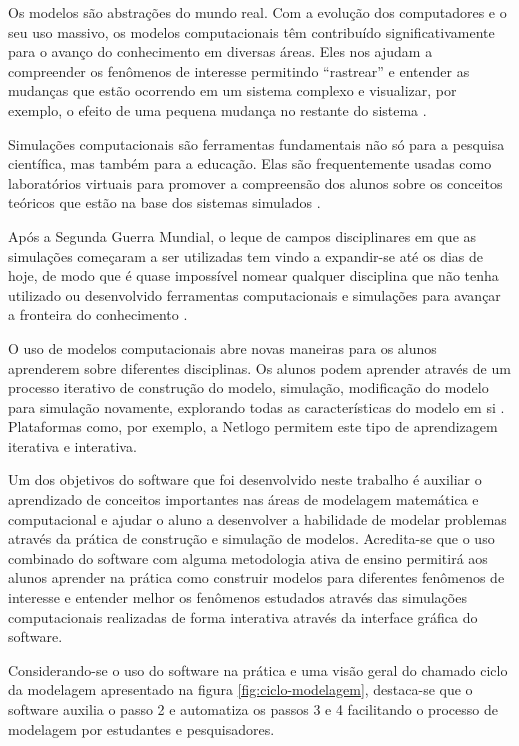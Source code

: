 \documentclass[
	12pt,				%
	openright,			%
	oneside,			%
	a4paper,			%
	main=brazil,
	english,			%
	]{ufsj-abntex2}
\begin{document}
Os modelos são abstrações do mundo real. Com a evolução dos computadores e o seu uso massivo, os modelos computacionais têm contribuído significativamente para o avanço do conhecimento em diversas áreas. Eles nos ajudam a compreender os fenômenos de interesse permitindo “rastrear” e entender as mudanças que estão ocorrendo em um sistema complexo e visualizar, por exemplo, o efeito de uma pequena mudança no restante do sistema \cite{Eleonora2022}. 

Simulações computacionais são ferramentas fundamentais não só para a pesquisa científica, mas também para a educação. Elas são frequentemente usadas como laboratórios virtuais para promover a compreensão dos alunos sobre os conceitos teóricos que estão na base dos sistemas simulados \cite{Eleonora2022}. 

Após a Segunda Guerra Mundial, o leque de campos disciplinares em que as simulações começaram a ser utilizadas tem vindo a expandir-se até os dias de hoje, de modo que é quase impossível nomear qualquer disciplina que não tenha utilizado ou desenvolvido ferramentas computacionais e simulações para avançar a fronteira do conhecimento \cite{Borrelli2019}.

O uso de modelos computacionais abre novas maneiras para os alunos aprenderem sobre diferentes disciplinas. Os alunos podem aprender através de um processo iterativo de construção do modelo, simulação, modificação do modelo para simulação novamente, explorando todas as características do modelo em si \cite{Eleonora2022}. Plataformas como, por exemplo, a Netlogo \cite{Netlogo2015} permitem este tipo de aprendizagem iterativa e interativa.

Um dos objetivos do software que foi desenvolvido neste trabalho é auxiliar o aprendizado de conceitos importantes nas áreas de modelagem matemática e computacional e ajudar o aluno a desenvolver a habilidade de modelar problemas através da prática de construção e simulação de modelos. Acredita-se que o uso combinado do software com alguma metodologia ativa de ensino permitirá aos alunos aprender na prática como construir modelos para diferentes fenômenos de interesse e entender melhor os fenômenos estudados através das simulações computacionais realizadas de forma interativa através da interface gráfica do software. 

Considerando-se o uso do software na prática e uma visão geral do chamado ciclo da modelagem apresentado na figura \ref{fig:ciclo-modelagem}, destaca-se que o software auxilia o passo 2 e automatiza os passos 3 e 4 facilitando o processo de modelagem por estudantes e pesquisadores. 
\end{document}
